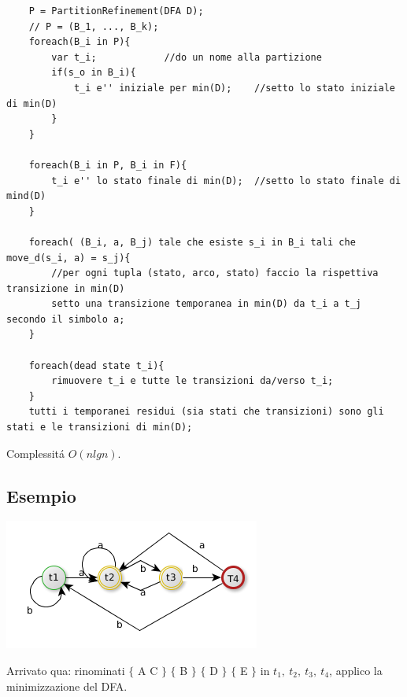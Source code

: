 \begin{lstlisting}
    P = PartitionRefinement(DFA D);
    // P = (B_1, ..., B_k);
    foreach(B_i in P){
        var t_i;            //do un nome alla partizione
        if(s_o in B_i){
            t_i e'' iniziale per min(D);    //setto lo stato iniziale di min(D)
        }
    }

    foreach(B_i in P, B_i in F){
        t_i e'' lo stato finale di min(D);  //setto lo stato finale di mind(D)
    }

    foreach( (B_i, a, B_j) tale che esiste s_i in B_i tali che move_d(s_i, a) = s_j){
        //per ogni tupla (stato, arco, stato) faccio la rispettiva transizione in min(D)
        setto una transizione temporanea in min(D) da t_i a t_j secondo il simbolo a;
    }

    foreach(dead state t_i){
        rimuovere t_i e tutte le transizioni da/verso t_i;
    }
    tutti i temporanei residui (sia stati che transizioni) sono gli stati e le transizioni di min(D);
\end{lstlisting}
Complessit\'a $O(nlgn)$.

\subsection{Esempio}

\begin{center}
	\includegraphics[scale=0.5]{Chapters/Img/c02_06.png}\\
\end{center} 
Arrivato qua: rinominati $\{$ A C $\}$ $\{$ B $\}$ $\{$ D $\}$ $\{$ E $\}$ in $t_1,\ t_2,\ t_3,\ t_4 $,
applico la minimizzazione del DFA.


